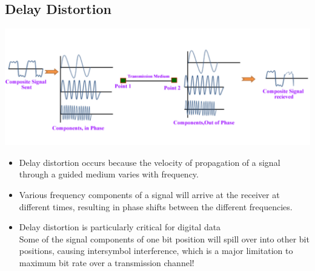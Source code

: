 \documentclass[11pt]{article}
\begin{document}
\subsection{Delay Distortion}
\includegraphics[width=\textwidth]{delay-distortion}
\begin{itemize}
    \item Delay distortion occurs because the velocity of propagation of a signal through a guided medium varies with frequency.
    \item Various frequency components of a signal will arrive at the receiver at different times, resulting in phase shifts between the different frequencies.
    \item Delay distortion is particularly critical for digital data \\
    Some of the signal components of one bit position will spill over into other bit positions, causing intersymbol interference, which is a major limitation to maximum bit rate over a transmission channel!
\end{itemize}
\end{document}
